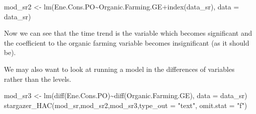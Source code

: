 \documentclass[
]{article}
\newenvironment{Shaded}{\begin{snugshade}}{\end{snugshade}}
\newcommand{\AttributeTok}[1]{\textcolor[rgb]{0.77,0.63,0.00}{#1}}
\newcommand{\FunctionTok}[1]{\textcolor[rgb]{0.00,0.00,0.00}{#1}}
\newcommand{\NormalTok}[1]{#1}
\newcommand{\OtherTok}[1]{\textcolor[rgb]{0.56,0.35,0.01}{#1}}
\newcommand{\SpecialCharTok}[1]{\textcolor[rgb]{0.00,0.00,0.00}{#1}}
\newcommand{\StringTok}[1]{\textcolor[rgb]{0.31,0.60,0.02}{#1}}
\begin{document}
\begin{Shaded}
\begin{Highlighting}[]
\NormalTok{mod\_sr2 }\OtherTok{\textless{}{-}} \FunctionTok{lm}\NormalTok{(Ene.Cons.PO}\SpecialCharTok{\textasciitilde{}}\NormalTok{Organic.Farming.GE}\SpecialCharTok{+}\FunctionTok{index}\NormalTok{(data\_sr), }\AttributeTok{data =}\NormalTok{ data\_sr)}
\end{Highlighting}
\end{Shaded}

Now we can see that the time trend is the variable which becomes
significant and the coefficient to the organic farming variable becomes
insignificant (as it should be).

We may also want to look at running a model in the differences of
variables rather than the levels.

\begin{Shaded}
\begin{Highlighting}[]
\NormalTok{mod\_sr3 }\OtherTok{\textless{}{-}} \FunctionTok{lm}\NormalTok{(}\FunctionTok{diff}\NormalTok{(Ene.Cons.PO)}\SpecialCharTok{\textasciitilde{}}\FunctionTok{diff}\NormalTok{(Organic.Farming.GE), }\AttributeTok{data =}\NormalTok{ data\_sr)}
\FunctionTok{stargazer\_HAC}\NormalTok{(mod\_sr,mod\_sr2,mod\_sr3,}\AttributeTok{type\_out =} \StringTok{"text"}\NormalTok{, }\AttributeTok{omit.stat =} \StringTok{"f"}\NormalTok{)}
\end{Highlighting}
\end{Shaded}
\end{document}
